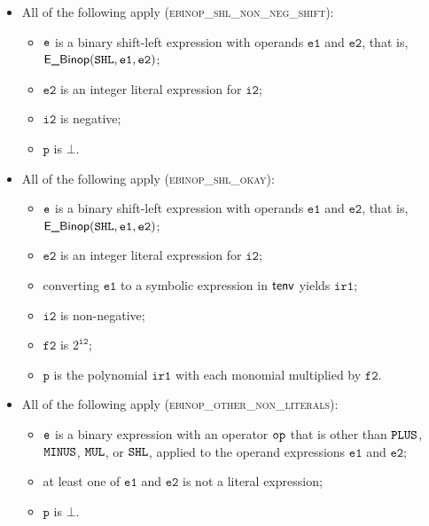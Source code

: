 \documentclass{book}
\newcommand\vitwo[0]{\texttt{i2}}
\newcommand\vftwo[0]{\texttt{f2}}
\newcommand\vp[0]{\texttt{p}}
\newcommand\veone[0]{\texttt{e1}}
\newcommand\vetwo[0]{\texttt{e2}}
\newcommand\irone[0]{\texttt{ir1}}
\begin{document}
\begin{itemize}
  \item All of the following apply (\textsc{ebinop\_shl\_non\_neg\_shift}):
  \begin{itemize}
    \item $\texttt{e}$ is a binary shift-left expression with operands $\veone$ and $\vetwo$, that is, \\ $\EBinop(\SHL, \veone, \vetwo)$;
    \item $\vetwo$ is an integer literal expression for $\vitwo$;
    \item $\vitwo$ is negative;
    \item $\vp$ is $\bot$.
  \end{itemize}

  \item All of the following apply (\textsc{ebinop\_shl\_okay}):
  \begin{itemize}
    \item $\texttt{e}$ is a binary shift-left expression with operands $\veone$ and $\vetwo$, that is, \\ $\EBinop(\SHL, \veone, \vetwo)$;
    \item $\vetwo$ is an integer literal expression for $\vitwo$;
    \item converting $\veone$ to a symbolic expression in $\textsf{tenv}$ yields $\irone$\ProseOrTypeErrorOrBot;
    \item $\vitwo$ is non-negative;
    \item $\vftwo$ is $2^{\vitwo}$;
    \item $\vp$ is the polynomial $\irone$ with each monomial multiplied by $\vftwo$.
  \end{itemize}

  \item All of the following apply (\textsc{ebinop\_other\_non\_literals}):
  \begin{itemize}
    \item $\texttt{e}$ is a binary expression with an operator $\texttt{op}$ that is other than $\texttt{PLUS}$, $\texttt{MINUS}$, $\texttt{MUL}$, or $\texttt{SHL}$,
          applied to the operand expressions $\veone$ and $\vetwo$;
    \item at least one of $\veone$ and $\vetwo$ is not a literal expression;
    \item $\vp$ is $\bot$.
  \end{itemize}


\end{itemize}
\end{document}
